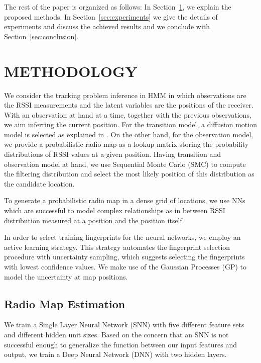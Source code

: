 \documentclass[conference]{IEEEtran}
\begin{document}
{	%
	
	The rest of the paper is organized as follows: In Section~\ref{sec:methodology}, we explain the proposed methods. In Section~\ref{sec:experiments} we give the details of experiments and discuss the achieved results and we conclude with Section~\ref{sec:conclusion}.
	
	\section{METHODOLOGY}
	\label{sec:methodology}
	We consider the tracking problem inference in HMM \cite{barberBRML2012} in which observations are the RSSI measurements and the latent variables are the positions of the receiver. With an observation at hand at a time, together with the previous observations, we aim inferring the current position. For the transition model, a diffusion motion model is selected as explained in \cite{Ser2017}. On the other hand, for the observation model, we provide a probabilistic radio map as a lookup matrix storing the probability distributions of RSSI values at a given position. Having transition and observation model at hand, we use Sequential Monte Carlo (SMC) to compute the filtering distribution and select the most likely position of this distribution as the candidate location.
	
	To generate a probabilistic radio map in a dense grid of locations, we use NNs which are successful to model complex relationships as in between RSSI distribution measured at a position and the position itself. 
	
	In order to select training fingerprints for the neural networks, we employ an active learning strategy. %
	This strategy automates the fingerprint selection procedure with uncertainty sampling, which suggests selecting the fingerprints with lowest confidence values. We make use of the Gaussian Processes (GP) to model the uncertainty at map positions.
	
	\subsection{Radio Map Estimation}
	We train a Single Layer Neural Network (SNN) with five different feature sets and different hidden unit sizes. Based on the concern that an SNN is not successful enough to generalize the function between our input features and output, we train a Deep Neural Network (DNN) with two hidden layers.
	
}
\end{document}
